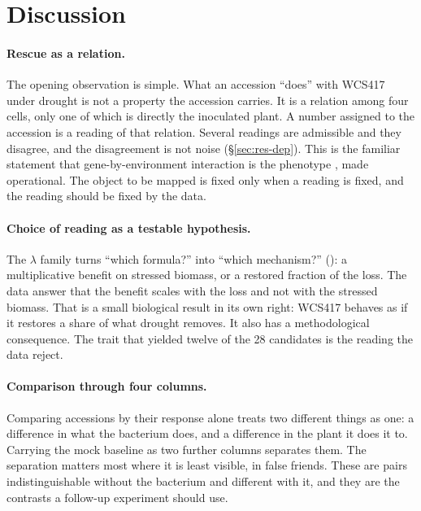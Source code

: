 \documentclass[10pt,twocolumn,a4paper]{article}
\theoremstyle{definition}
\theoremstyle{remark}
\begin{document}
\section{Discussion}
\label{sec:discussion}

\paragraph{Rescue as a relation.} The opening observation is simple.
What an accession ``does'' with WCS417 under drought is not a property
the accession carries. It is a relation among four cells, only one of
which is directly the inoculated plant. A number assigned to the
accession is a reading of that relation. Several readings are admissible
and they disagree, and the disagreement is not noise
(\S\ref{sec:res-dep}). This is the familiar statement that
gene-by-environment interaction is the phenotype
\citep{elsoda2014,desmarais2013}, made operational. The object to be
mapped is fixed only when a reading is fixed, and the reading should be
fixed by the data.

\paragraph{Choice of reading as a testable hypothesis.} The $\lambda$
family turns ``which formula?'' into ``which mechanism?''
(): a multiplicative benefit on stressed biomass, or
a restored fraction of the loss. The data answer that the benefit scales
with the loss and not with the stressed biomass. That is a small
biological result in its own right: WCS417 behaves as if it restores a
share of what drought removes. It also has a methodological consequence.
The trait that yielded twelve of the 28 candidates is the reading the
data reject.

\paragraph{Comparison through four columns.} Comparing accessions by
their response alone treats two different things as one: a difference in
what the bacterium does, and a difference in the plant it does it to.
Carrying the mock baseline as two further columns separates them. The
separation matters most where it is least visible, in false friends.
These are pairs indistinguishable without the bacterium and different
with it, and they are the contrasts a follow-up experiment should use.
\end{document}
